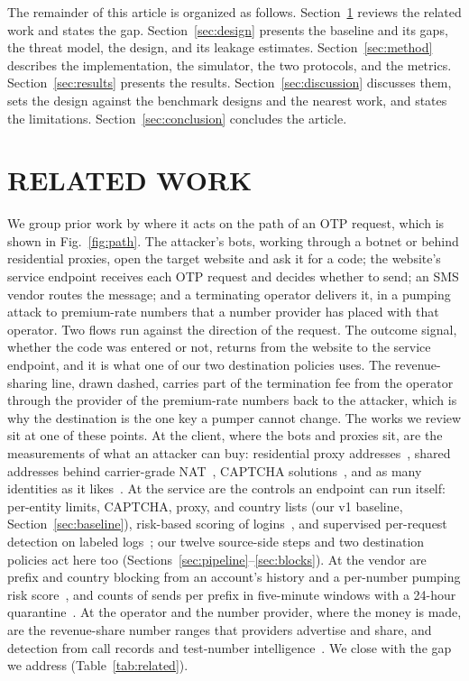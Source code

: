 \documentclass{IEEEoj}
\begin{document}
The remainder of this article is organized as follows. Section~\ref{sec:related} reviews the related work and states the gap. Section~\ref{sec:design} presents the baseline and its gaps, the threat model, the design, and its leakage estimates. Section~\ref{sec:method} describes the implementation, the simulator, the two protocols, and the metrics. Section~\ref{sec:results} presents the results. Section~\ref{sec:discussion} discusses them, sets the design against the benchmark designs and the nearest work, and states the limitations. Section~\ref{sec:conclusion} concludes the article.

\section{RELATED WORK}
\label{sec:related}

We group prior work by where it acts on the path of an OTP request, which is shown in Fig.~\ref{fig:path}. The attacker's bots, working through a botnet or behind residential proxies, open the target website and ask it for a code; the website's service endpoint receives each OTP request and decides whether to send; an SMS vendor routes the message; and a terminating operator delivers it, in a pumping attack to premium-rate numbers that a number provider has placed with that operator. Two flows run against the direction of the request. The outcome signal, whether the code was entered or not, returns from the website to the service endpoint, and it is what one of our two destination policies uses. The revenue-sharing line, drawn dashed, carries part of the termination fee from the operator through the provider of the premium-rate numbers back to the attacker, which is why the destination is the one key a pumper cannot change. The works we review sit at one of these points. At the client, where the bots and proxies sit, are the measurements of what an attacker can buy: residential proxy addresses~\cite{mi2019resip}, shared addresses behind carrier-grade NAT~\cite{richter2016cgn}, CAPTCHA solutions~\cite{motoyama2010captcha,dionysiou2020captcha}, and as many identities as it likes~\cite{douceur2002sybil}. At the service are the controls an endpoint can run itself: per-entity limits, CAPTCHA, proxy, and country lists (our v1 baseline, Section~\ref{sec:baseline}), risk-based scoring of logins~\cite{wiefling2019rba}, and supervised per-request detection on labeled logs~\cite{huh2025ait}; our twelve source-side steps and two destination policies act here too (Sections~\ref{sec:pipeline}--\ref{sec:blocks}). At the vendor are prefix and country blocking from an account's history and a per-number pumping risk score~\cite{twilio_fraudguard,twilio_pumping_risk}, and counts of sends per prefix in five-minute windows with a 24-hour quarantine~\cite{zaliskyi2026ait}. At the operator and the number provider, where the money is made, are the revenue-share number ranges that providers advertise and share, and detection from call records and test-number intelligence~\cite{sahin2017sok,sahin2021irsf}. We close with the gap we address (Table~\ref{tab:related}).
\end{document}
